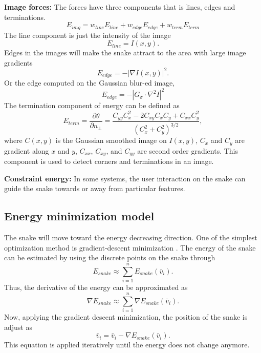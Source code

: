 \textbf{Image forces: } The forces have three components that is lines, edges and terminations.
\begin{equation}
E_{img} = w_{line}E_{line} + w_{edge}E_{edge} + w_{term}E_{term}
\end{equation}
The line component is just the intensity of the image
\begin{equation}
E_{line} = I(x,y).
\end{equation}
Edges in the images will make the snake attract to the area with large image gradients
\begin{equation}
E_{edge} = -|\nabla I(x,y)|^2.
\end{equation}
Or the edge computed on the Gaussian blur-ed image,
\begin{equation}
E_{edge} = -|G_\sigma \cdot \nabla^2 I|^2
\end{equation}
The termination component of energy can be defined as
\begin{equation}
E_{term} = \frac{\partial \theta}{\partial n_\perp} = \frac{C_{yy}C_x^2 - 2C_{xy}C_xC_y + C_{xx}C_y^2}{(C_x^2 + C_y^2)^{3/2}},
\end{equation}
where $C(x,y)$ is the Gaussian smoothed image on $I(x,y)$, $C_x$ and $C_y$ are gradient along $x$ and $y$, $C_{xx}$, $C_{xy}$, and $C_{yy}$ are second order gradients. This component is used to detect corners and terminations in an image.

\textbf{Constraint energy: } In some systems, the user interaction on the snake can guide the snake towards or away from particular features. 
\subsection{Energy minimization model}
The snake will move toward the energy decreasing direction. One of the simplest optimization method is gradient-descent minimization \cite{snyman2005practical}. The energy of the snake can be estimated by using the discrete points on the snake through 
\begin{equation}
E_{snake} \approx \sum_{i=1}^nE_{snake}(\bar{v}_i).
\end{equation}
Thus, the derivative of the energy can be approximated as
\begin{equation}
\nabla E_{snake} \approx \sum_{i=1}^n \nabla E_{snake}(\bar{v}_i).
\end{equation}
Now, applying the gradient descent minimization, the position of the snake is adjust as
\begin{equation}
\bar{v}_i = \bar{v}_i - \nabla E_{snake}(\bar{v}_i).
\end{equation}
This equation is applied iteratively until the energy does not change anymore.

